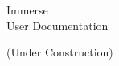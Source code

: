 \documentclass{memoir}
\begin{document}
\begin{flushright}
	\vspace*{2in}
	{\fontsize{50}{60}\selectfont Immerse}  \\
	\vspace{20pt}
	{\fontsize{30}{40}\selectfont User Documentation}
\end{flushright}

\newpage
\rfoot{\thepage}
(Under Construction)
\end{document}
